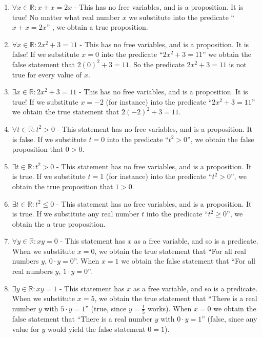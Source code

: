\begin{solutions}
		\begin{enumerate}
		\item $\forall x \in \mathbb{R}: x + x = 2x$ - This has no free variables, and is a proposition.  It is true!  No matter what real number $x$ we substitute into the predicate ``$x+x  =2x$'' , we obtain a true proposition.
		\item $\forall x \in \mathbb{R}: 2x^2 + 3 = 11$ - This has no free variables, and is a proposition.  It is false!  If we substitute $x = 0$ into the predicate ``$2x^2+3 = 11$'' we obtain the false statement that $2(0)^2+3 = 11$.  So the predicate $2x^2+3 = 11$ is not true for every value of $x$.
		\item $\exists x \in \mathbb{R}: 2x^2 + 3 = 11$ - This has no free variables, and is a proposition.  It is true!  If we substitute $x = -2$ (for instance) into the predicate ``$2x^2+3 = 11$''  we obtain the true statement that $2(-2)^2 + 3 = 11$.
		\item $\forall t \in \mathbb{R}: t^2 > 0$ - This statement has no free variables, and is a proposition.  It is false.  If we substitute $t=0$ into the predicate ``$t^2>0$'', we obtain the false proposition that $0>0$.
		\item $\exists t \in \mathbb{R}: t^2 > 0$ - This statement has no free variables, and is a proposition.  It is true.  If we substitute $t=1$ (for instance) into the predicate ``$t^2>0$'', we obtain the true proposition that $1>0$.
		\item $\exists t \in \mathbb{R}: t^2 \leq 0$ - This statement has no free variables, and is a proposition.  It is true.  If we substitute any real number $t$ into the predicate ``$t^2 \geq0$'', we obtain the a true proposition.
		\item $\forall y \in \mathbb{R}:  xy = 0$ - This statement has $x$ as a free variable, and so is a  predicate.  When we substitute $x = 0$, we obtain the true statement that ``For all real numbers $y$, $0 \cdot y = 0$''.  When $x = 1$ we obtain the false statement that ``For all real numbers $y$, $1 \cdot y = 0$''.
		\item $\exists y \in \mathbb{R}:  xy = 1$ - This statement has $x$ as a free variable, and so is a  predicate.  When we substitute $x = 5$, we obtain the true statement that ``There is a real number $y$ with  $5 \cdot y = 1$'' (true, since $y = \frac{1}{5}$ works).   When $x = 0$ we obtain the false statement that ``There is a real number $y$ with  $0 \cdot y = 1$'' (false, since any value for $y$ would yield the false statement $ 0 = 1$).

\end{enumerate}
\end{solutions}
